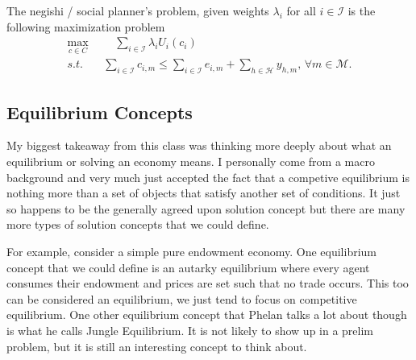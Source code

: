 \documentclass[11pt,english]{article}
\begin{document}
\begin{definition}
The negishi / social planner's problem, given weights $\lambda_i$ for all $i\in \mathcal{I}$ is the following maximization problem
\begin{align*}
\max_{c\in C}&\quad \sum_{i\in \mathcal{I}} \lambda_iU_i(c_i)\\
s.t.\quad & \sum_{i\in \mathcal{I}}c_{i,m} \leq  \sum_{i\in \mathcal{I}}e_{i,m} + \sum_{h\in \mathcal{H}} y_{h,m},\,\forall m\in \mathcal{M}.
\end{align*}
\end{definition}


\subsection{Equilibrium Concepts}
My biggest takeaway from this class was thinking more deeply about what an equilibrium or solving an economy means. I personally come from a macro background and very much just accepted the fact that a competive equilibrium is nothing more than a set of objects that satisfy another set of conditions. It just so happens to be the generally agreed upon solution concept but there are many more types of solution concepts that we could define.

For example, consider a simple pure endowment economy. One equilibrium concept that we could define is an autarky equilibrium where every agent consumes their endowment and prices are set such that no trade occurs. This too can be considered an equilibrium, we just tend to focus on competitive equilibrium. One other equilibrium concept that Phelan talks a lot about though is what he calls Jungle Equilibrium. It is not likely to show up in a prelim problem, but it is still an interesting concept to think about.
\end{document}

